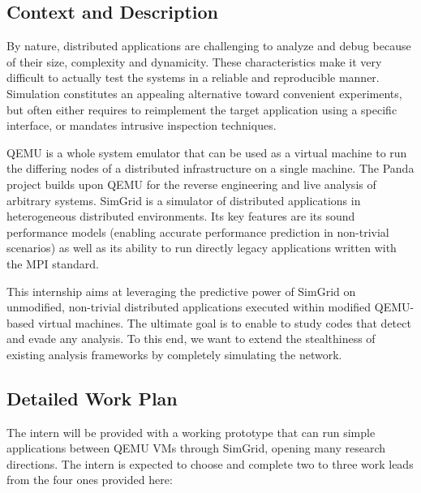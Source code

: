 \documentclass[a4paper,11pt]{article}
\begin{document}
\medskip
\subsection*{Context and Description}
\vspace{-.3\baselineskip}

By nature, distributed applications are challenging to analyze and debug because of their size,
complexity and dynamicity. These characteristics make it very difficult to actually test the systems
in a reliable and reproducible manner. Simulation constitutes an appealing alternative toward
convenient experiments, but often either requires to reimplement the target application using a
specific interface, or mandates intrusive inspection techniques.

QEMU is a whole system emulator that can be used as a virtual machine to run the differing nodes of
a distributed infrastructure on a single machine. The Panda project builds upon QEMU for the reverse
engineering and live analysis of arbitrary systems.
%
SimGrid is a simulator of distributed applications in heterogeneous distributed environments. Its
key features are its sound performance models (enabling accurate performance prediction in
non-trivial scenarios) as well as its ability to run directly legacy applications written with the
MPI standard.


This internship aims at leveraging the predictive power of SimGrid on unmodified, non-trivial
distributed applications executed within modified QEMU-based virtual machines. The ultimate goal is
to enable to study codes that detect and evade any analysis. To this end, we want to
extend the stealthiness of existing analysis frameworks by completely simulating the network.

\smallskip

\subsection*{Detailed Work Plan}
\vspace{-.3\baselineskip}

The intern will be provided with a working prototype that can run simple applications between QEMU
VMs through SimGrid, opening many research directions. The intern is expected to choose and complete
two to three work leads from the four ones provided here: \vspace{-.3\baselineskip}
\end{document}
